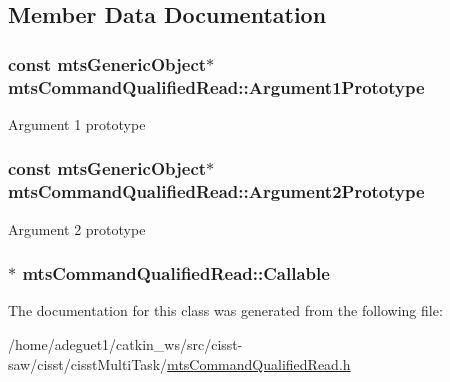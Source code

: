 \subsection{Member Data Documentation}
\hypertarget{classmts_command_qualified_read_a58d58aff10b3c1172c03ac26c5024802}{
\subsubsection[{Argument1\-Prototype}]{\setlength{\rightskip}{0pt plus 5cm}const {\bf mts\-Generic\-Object}$\ast$ mts\-Command\-Qualified\-Read\-::\-Argument1\-Prototype\hspace{0.3cm}{\ttfamily [protected]}}}\label{classmts_command_qualified_read_a58d58aff10b3c1172c03ac26c5024802}
Argument 1 prototype \hypertarget{classmts_command_qualified_read_a81d40a7ee71e5324beea816f6ec7218b}{
\subsubsection[{Argument2\-Prototype}]{\setlength{\rightskip}{0pt plus 5cm}const {\bf mts\-Generic\-Object}$\ast$ mts\-Command\-Qualified\-Read\-::\-Argument2\-Prototype\hspace{0.3cm}{\ttfamily [protected]}}}\label{classmts_command_qualified_read_a81d40a7ee71e5324beea816f6ec7218b}
Argument 2 prototype \hypertarget{classmts_command_qualified_read_a7579aea578773a341532747fcf77c41c}{
\subsubsection[{Callable}]{$\ast$ mts\-Command\-Qualified\-Read\-::\-Callable\hspace{0.3cm}{\ttfamily [protected]}}}\label{classmts_command_qualified_read_a7579aea578773a341532747fcf77c41c}


The documentation for this class was generated from the following file\-:\begin{DoxyCompactItemize}
\item 
/home/adeguet1/catkin\-\_\-ws/src/cisst-\/saw/cisst/cisst\-Multi\-Task/\hyperlink{mts_command_qualified_read_8h}{mts\-Command\-Qualified\-Read.\-h}\end{DoxyCompactItemize}
